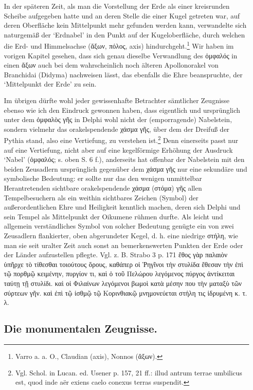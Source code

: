 \documentclass[a4paper, 11pt, oneside]{article}
\begin{document}
In der späteren Zeit, als man die Vorstellung der Erde als einer kreisrunden Scheibe aufgegeben hatte und an deren Stelle die einer Kugel getreten war, auf deren Oberfläche kein Mittelpunkt mehr gefunden werden kann, verwandelte sich naturgemäß der `Erdnabel' in den Punkt auf der Kugeloberfläche, durch welchen die Erd- und Himmelsachse (ἄξων, πόλος, axis) hindurchgeht.\footnote{Varro a. a. O., Claudian (axis), Nonnos (ἄξων).} Wir haben im vorigen Kapitel gesehen, dass sich genau dieselbe Verwandlung des ὀμφαλός in einen ἄξων auch bei dem wahrscheinlich noch älteren Apollonorakel von Branchidai (Didyma) nachweisen lässt, das ebenfalls die Ehre beanspruchte, der `Mittelpunkt der Erde' zu sein.

Im übrigen dürfte wohl jeder gewissenhafte Betrachter sämtlicher Zeugnisse ebenso wie ich den Eindruck gewonnen haben, dass eigentlich und ursprünglich unter dem ὀμφαλὸς γῆς in Delphi wohl nicht der (emporragende) Nabelstein, sondern vielmehr das orakelspendende χάσμα γῆς, über dem der Dreifuß der Pythia stand, also eine Vertiefung, zu verstehen ist.\footnote{Vgl. Schol. in Lucan. ed. Usener p. 157, 21 ff.: illud antrum terrae umbilicus est, quod inde aër exiens caelo conexus terras suspendit.} Denn einerseits passt nur auf eine Vertiefung, nicht aber auf eine kegelförmige Erhöhung der Ausdruck `Nabel' (ὀμφαλός; s. oben S. 6 f.), anderseits hat offenbar der Nabelstein mit den beiden Zeusadlern ursprünglich gegenüber dem χάσμα γῆς nur eine sekundäre und symbolische Bedeutung: er sollte nur das den wenigen unmittelbar Herantretenden sichtbare orakelspendende χάσμα (στόμα) γῆς allen Tempelbesuchern als ein weithin sichtbares Zeichen (Symbol) der außerordentlichen Ehre und Heiligkeit kenntlich machen, deren sich Delphi und sein Tempel als Mittelpunkt der Oikumene rühmen durfte. Als leicht und allgemein verständliches Symbol von solcher Bedeutung genügte ein von zwei Zeusadlern flankierter, oben abgerundeter Kegel, d. h. eine niedrige στήλη, wie man sie seit uralter Zeit auch sonst an bemerkenswerten Punkten der Erde oder der Länder aufzustellen pflegte. Vgl. z. B. Strabo 3 p. 171 ἔθος γὰρ παλαιὸν ὑπῆρχε τὸ τίθεσθαι τοιούτους ὅρους, καθάπερ οἱ Ῥηγῖνοι τὴν στυλίδα ἔθεσαν τὴν ἐπὶ τῷ πορθμῷ κειμένην, πυργίον τι, καὶ ὁ τοῦ Πελώρου λεγόμενος πύργος ἀντίκειται ταύτῃ τῇ στυλίδι. καὶ οἱ Φιλαίνων λεγόμενοι βωμοὶ κατὰ μέσην που τὴν ματαξὺ τῶν σύρτεων γῆν. καὶ ἐπὶ τῷ ἰσθμῷ τῷ Κορινθιακῷ μνημονεύεται στήλη τις ἱδρυμένη κ. τ. λ.

\subsection{Die monumentalen Zeugnisse.}
\end{document}
